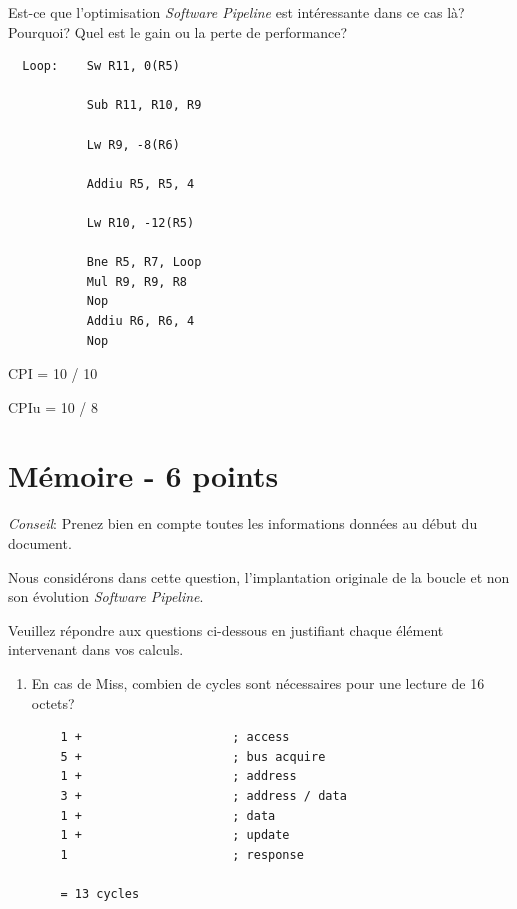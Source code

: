 {Est-ce que l'optimisation \textit{Software Pipeline} est int\'eressante
dans ce cas l\`a? Pourquoi? Quel est le gain ou la perte de performance?

\begin{correction}

  \begin{verbatim}
  Loop:    Sw R11, 0(R5)

           Sub R11, R10, R9

           Lw R9, -8(R6)

           Addiu R5, R5, 4

           Lw R10, -12(R5)

           Bne R5, R7, Loop
           Mul R9, R9, R8
           Nop
           Addiu R6, R6, 4
           Nop
  \end{verbatim}

  CPI = 10 / 10

  CPIu = 10 / 8

\end{correction}

%
%

\section{M\'emoire - 6 points}

\textit{Conseil}: Prenez bien en compte toutes les informations
donn\'ees au d\'ebut du document.

Nous consid\'erons dans cette question, l'implantation originale de la
boucle et non son \'evolution \textit{Software Pipeline}.

Veuillez r\'epondre aux questions ci-dessous en justifiant chaque \'el\'ement
intervenant dans vos calculs.

\begin{enumerate}
  \item
    En cas de Miss, combien de cycles sont n\'ecessaires pour une lecture de
    16 octets?

    \begin{correction}

      \begin{verbatim}
	1 +                     ; access
	5 +                     ; bus acquire
	1 +                     ; address
	3 +                     ; address / data
	1 +                     ; data
	1 +                     ; update
	1                       ; response

	= 13 cycles
      \end{verbatim}


\end{correction}
\end{enumerate}}
